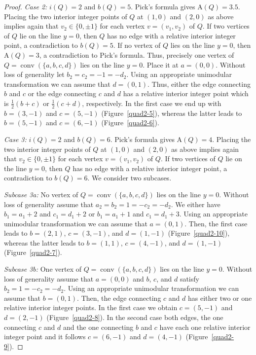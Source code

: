 \documentclass[a4paper]{article}
\theoremstyle{plain}
\begin{document}
\begin{proof}
\emph{Case 2:} $i(Q) = 2$ and $b(Q) = 5$.
Pick's formula gives ${\mathrm{A}}(Q) = 3{.}5$.
Placing the two interior integer points of $Q$ at $(1,0)$
and $(2,0)$ as above implies again that $v_2 \in \{0, \pm
1\}$ for each vertex $v = (v_1, v_2)$ of $Q$.
If two vertices of $Q$ lie on the line $y = 0$, then $Q$ has
no edge with a relative interior integer point, a
contradiction to $b(Q) = 5$.
If no vertex of $Q$ lies on the line $y = 0$, then ${\mathrm{A}}(Q)
= 3$, a contradiction to Pick's formula.
Thus, precisely one vertex of $Q = {{\mathop{\mathrm{{conv}}}}}(\{a,b,c,d\})$ lies
on the line $y = 0$.
Place it at $a = (0,0)$.
Without loss of generality let $b_2 = c_2 = -1 = - d_2$.
Using an appropriate unimodular transformation we can assume
that $d = (0,1)$.
Thus, either the edge connecting $b$ and $c$ or the edge
connecting $c$ and $d$ has a relative interior integer point
which is $\frac{1}{2}(b+c)$ or $\frac{1}{2}(c+d)$,
respectively.
In the first case we end up with $b = (3,-1)$ and $c =
(5,-1)$ (Figure~\ref{quad2-5}), whereas the latter leads to
$b = (5,-1)$ and $c = (6,-1)$ (Figure~\ref{quad2-6}).

\emph{Case 3:}  $i(Q) = 2$ and $b(Q) = 6$. 
Pick's formula gives ${\mathrm{A}}(Q) = 4$.
Placing the two interior integer points of $Q$ at $(1,0)$
and $(2,0)$ as above implies again that $v_2 \in \{0, \pm
1\}$ for each vertex  $v = (v_1, v_2)$ of $Q$.
If two vertices of $Q$ lie on the line $y = 0$, then $Q$ has
no edge with a relative interior integer point, a
contradiction to $b(Q) = 6$. 
We consider two subcases.

\emph{Subcase 3a:} No vertex of $Q = {{\mathop{\mathrm{{conv}}}}}(\{a,b,c,d\})$ lies on the line
$y = 0$.
Without loss of generality assume that $a_2 = b_2 = 1 =
- c_2 = - d_2$.
We either have $b_1 = a_1 + 2$ and $c_1 = d_1 + 2$ or $b_1 =
a_1 + 1$ and $c_1 = d_1 + 3$.
Using an appropriate unimodular transformation we can assume
that $a = (0,1)$.
Then, the first case leads to $b = (2,1)$, $c = (3,-1)$, and
$d = (1,-1)$ (Figure~\ref{quad2-10}), whereas the latter
leads to $b = (1,1)$, $c = (4,-1)$, and $d = (1,-1)$
(Figure~\ref{quad2-7}).

\emph{Subcase 3b:} One vertex of $Q = {{\mathop{\mathrm{{conv}}}}}(\{a,b,c,d\})$ lies on the
line $y = 0$.
Without loss of generality assume that $a = (0,0)$ and
$b$, $c$, and $d$ satisfy $b_2 = 1 = - c_2 = - d_2$.
Using an appropriate unimodular transformation we can assume
that $b = (0,1)$. 
Then, the edge connecting $c$ and $d$ has either two or one
relative interior integer points.
In the first case we obtain $c = (5,-1)$ and $d = (2,-1)$
(Figure~\ref{quad2-8}).
In the second case both edges, the one connecting $c$ and
$d$ and the one connecting $b$ and $c$ have each one
relative interior integer point and it follows $c = (6,-1)$
and $d = (4,-1)$ (Figure~\ref{quad2-9}).
\end{proof}
\end{document}
